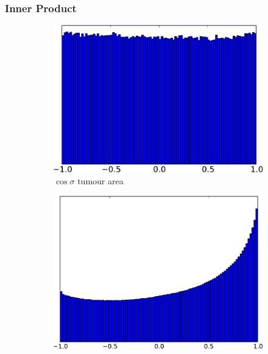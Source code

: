 \subsubsection{Inner Product}\label{subsubsec:singl_img_cosine_inner_product}
\begin{figure}
    \centering
    \hspace*{\fill}
    \begin{subfigure}[t]{0.32\textwidth}
        \centering
        \includegraphics[width=\textwidth]{statistical_normals/images/distributions/inner_product_tumour-crop}
        \caption{$\cos{\sigma}$ tumour area}\label{subfig:singl_img_inner_product_tumour}
    \end{subfigure} \hfill
    \begin{subfigure}[t]{0.32\textwidth}
        \centering
        \includegraphics[width=\textwidth]{statistical_normals/images/distributions/inner_product_all-crop}

\end{subfigure}
\end{figure}
